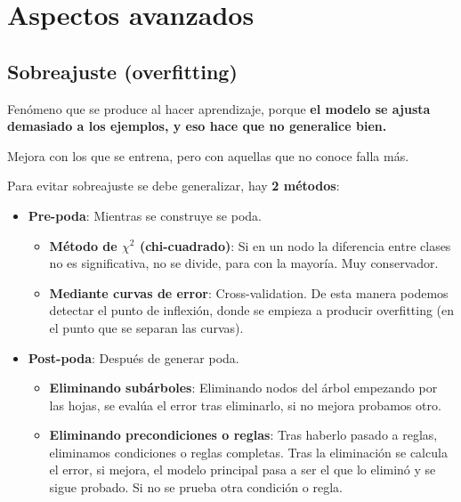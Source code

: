 \documentclass[12pt, twoside, openright]{report} %
\begin{document}
\section{Aspectos avanzados}

\subsection{Sobreajuste
	(overfitting)}

Fenómeno que se produce al hacer aprendizaje, porque \textbf{el modelo
	se ajusta demasiado a los ejemplos, y eso hace que no generalice bien.}

Mejora con los que se entrena, pero con aquellas que no conoce falla
más.

Para evitar sobreajuste se debe generalizar, hay \textbf{2 métodos}:

\begin{itemize}
	\item \textbf{Pre-poda}: Mientras se construye se poda.

	      \begin{itemize}
		      \item \textbf{Método de \(\chi^2\) (chi-cuadrado)}: Si en un nodo la
		            diferencia entre clases no es significativa, no se divide, para con
		            la mayoría. Muy conservador.
		      \item \textbf{Mediante curvas de error}: Cross-validation. De esta manera
		            podemos detectar el punto de inflexión, donde se empieza a producir
		            overfitting (en el punto que se separan las curvas).
	      \end{itemize}
	\item \textbf{Post-poda}: Después de generar poda.

	      \begin{itemize}
		      \item \textbf{Eliminando subárboles}: Eliminando nodos del árbol empezando
		            por las hojas, se evalúa el error tras eliminarlo, si no mejora
		            probamos otro.
		      \item \textbf{Eliminando precondiciones o reglas}: Tras haberlo pasado a
		            reglas, eliminamos condiciones o reglas completas. Tras la
		            eliminación se calcula el error, si mejora, el modelo principal pasa
		            a ser el que lo eliminó y se sigue probado. Si no se prueba otra
		            condición o regla.
	      \end{itemize}
\end{itemize}
\end{document}
